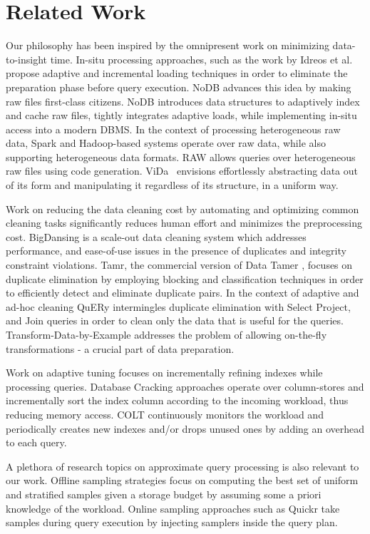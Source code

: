 \section{Related Work}
\label{sec:related}

Our philosophy has been inspired by the omnipresent work on minimizing data-to-insight time.
In-situ processing approaches, such as the work by Idreos et al. \cite{Idreos2011a} propose adaptive and incremental loading
techniques in order to eliminate the preparation phase before query execution. NoDB \cite{Alagiannis2015} advances this idea by making raw files first-class citizens. NoDB introduces data structures to adaptively index and cache raw files, tightly integrates adaptive loads, while implementing in-situ access into a modern DBMS. 
In the context of processing heterogeneous raw data,
Spark and Hadoop-based systems \cite{apache_drill,spark} operate over raw data, while also supporting heterogeneous data formats.
RAW \cite{Karpathiotakis2014} allows queries over heterogeneous raw files using code generation.
ViDa~\cite{Karpathiotakis2015} envisions effortlessly abstracting data out of its form and manipulating it regardless of its structure, in a uniform way.

Work on reducing the data cleaning cost by automating and optimizing common cleaning tasks significantly reduces human effort and minimizes the preprocessing cost. BigDansing \cite{bigdansing} is a scale-out
data cleaning system which addresses performance, and ease-of-use issues in the presence of duplicates and integrity constraint violations.
Tamr, the commercial version of Data Tamer \cite{Stonebraker_datacuration}, focuses on duplicate elimination
by employing blocking and classification techniques in order to efficiently detect and eliminate duplicate pairs.
In the context of adaptive and ad-hoc cleaning QuERy \cite{quERy} intermingles duplicate elimination with Select Project, and Join queries in order to clean only the data that is useful for the queries.
Transform-Data-by-Example \cite{transform-by-ex} addresses the problem of allowing on-the-fly transformations - a crucial part of data preparation.

Work on adaptive tuning focuses on incrementally refining indexes 
while processing queries. Database Cracking approaches 
\cite{Idreos2011} operate over column-stores and incrementally sort 
the index column according to the incoming workload, thus reducing 
memory access. COLT \cite{Schnaitter2006} continuously monitors the 
workload and periodically creates new indexes and/or drops unused 
ones by adding an overhead to each query.

A plethora of research topics on approximate query processing is also relevant to our work. Offline sampling strategies \cite{Agarwal2013,Chaudhuri2001b} focus on computing the best set of uniform and stratified samples given a storage budget by 
assuming some a priori knowledge of the workload. Online sampling approaches such as Quickr \cite{quickr} take samples during
query execution by injecting samplers inside the query plan.

